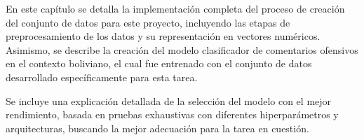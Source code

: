 En este capítulo se detalla la implementación completa del proceso de creación del conjunto de datos para este proyecto, incluyendo las etapas de preprocesamiento de los datos y su representación en vectores numéricos. Asimismo, se describe la creación del modelo clasificador de comentarios ofensivos en el contexto boliviano, el cual fue entrenado con el conjunto de datos desarrollado específicamente para esta tarea.

Se incluye una explicación detallada de la selección del modelo con el mejor rendimiento, basada en pruebas exhaustivas con diferentes hiperparámetros y arquitecturas, buscando la mejor adecuación para la tarea en cuestión.
